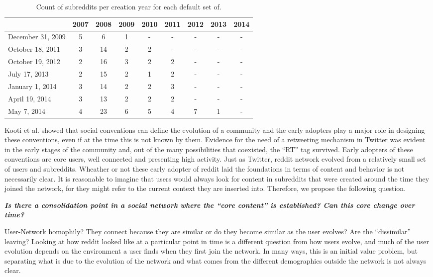 \begin{table}[htbp]
\centering
\tabcolsep=0.11cm
\singlespacing
\fontsize{7pt}{8pt}\selectfont
\begin{tabular}{|>{\raggedright\centering\arraybackslash}m{1.5cm}|c|c|c|c|c|c|c|c|}
\hline
 & 2007 & 2008 & 2009 & 2010 & 2011 & 2012 & 2013 & 2014 \\ \hline
December 31, 2009 & 5 & 6 & 1 & - & - & - & - & - \\ \hline
October 18, 2011 & 3 & 14 & 2 & 2 & - & - & - & - \\ \hline
October 19, 2012 & 2 & 16 & 3 & 2 & 2 & - & - & - \\ \hline
July 17, 2013 & 2 & 15 & 2 & 1 & 2 & - & - & - \\ \hline
January 1, 2014 & 3 & 14 & 2 & 2 & 3 & - & - & - \\ \hline
April 19, 2014 & 3 & 13 & 2 & 2 & 2 & - & - & - \\ \hline
May 7, 2014 & 4 & 23 & 6 & 5 & 4 & 7 & 1 & - \\ \hline
\end{tabular}
\caption{Count of subreddits per creation year for each default set of.}
\end{table}

Kooti et al. \cite{Kooti2010} showed that social conventions can define the evolution of a community and the early adopters play a major role in designing these conventions, even if at the time this is not known by them. Evidence for the need of a retweeting mechanism in Twitter was evident in the early stages of the community and, out of the many possibilities that coexisted, the ``RT'' tag survived. Early adopters of these conventions are core users, well connected and presenting high activity. Just as Twitter, reddit network evolved from a relatively small set of users and subreddits. Wheather or not these early adopter of reddit laid the foundations in terms of content and behavior is not necessarily clear. It is reasonable to imagine that users would always look for content in subreddits that were created around the time they joined the network, for they might refer to the current context they are inserted into. Therefore, we propose the following question.

\textbf{\textit{Is there a consolidation point in a social network where the ``core content'' is established? Can this core change over time?}}

User-Network homophily? They connect because they are similar or do they become similar as the user evolves? Are the ``dissimilar'' leaving?
Looking at how reddit looked like at a particular point in time is a different question from how users evolve, and much of the user evolution depends on the environment a user finds when they first join the network. In many ways, this is an initial value problem, but separating what is due to the evolution of the network and what comes from the different demographics outside the network is not always clear.

